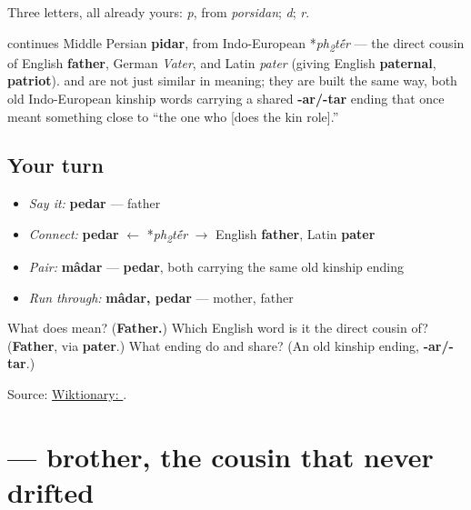 Three letters, all already yours: \textbf{} \emph{p}, from \emph{porsidan}; \textbf{} \emph{d}; \textbf{} \emph{r}.

\begin{cousinweb}
\textbf{} continues Middle Persian \textbf{pidar}, from Indo-European *\emph{ph\textsubscript{2}t\'{\={e}}r} — the direct cousin of English \textbf{father}, German \emph{Vater}, and Latin \emph{pater} (giving English \textbf{paternal}, \textbf{patriot}). \textbf{} and \textbf{} are not just similar in meaning; they are built the same way, both old Indo-European kinship words carrying a shared \textbf{-ar/-tar} ending that once meant something close to “the one who {[}does the kin role{]}.”
\end{cousinweb}

\subsection*{Your turn}
\begin{itemize}
\raggedright
  \item \emph{Say it:} \textbf{pedar} — father
  \item \emph{Connect:} \textbf{pedar} $\leftarrow$ *\emph{ph\textsubscript{2}t\'{\={e}}r} $\to$ English \textbf{father}, Latin \textbf{pater}
  \item \emph{Pair:} \textbf{mâdar} — \textbf{pedar}, both carrying the same old kinship ending
  \item \emph{Run through:} \textbf{mâdar, pedar} — mother, father
\end{itemize}

\begin{tcolorbox}[breakable,colback=teal!4,colframe=teal!35!black,title={Before you move on}]
What does \textbf{} mean? (\textbf{Father.}) Which English word is it the direct cousin of? (\textbf{Father}, via \textbf{pater}.) What ending do \textbf{} and \textbf{} share? (An old kinship ending, \textbf{-ar/-tar}.)

Source: \href{https://en.wiktionary.org/wiki/\%D9\%BE\%D8\%AF\%D8\%B1}{Wiktionary: }.
\end{tcolorbox}
\section[\texorpdfstring{\fa{برادر} (barâdar)}{برادر (barâdar)}]{ — brother, the cousin that never drifted}

